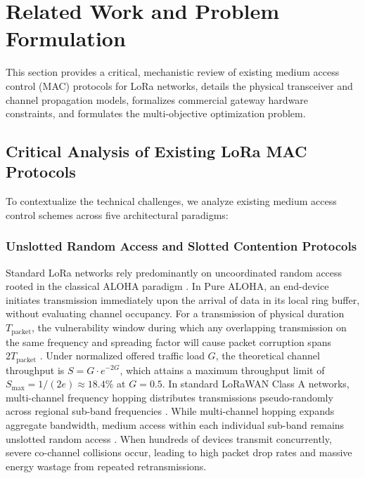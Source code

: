 \documentclass[preprint,review,12pt]{elsarticle}
\begin{document}
\section{Related Work and Problem Formulation}
\label{sec:related_work}

This section provides a critical, mechanistic review of existing medium access control (MAC) protocols for LoRa networks, details the physical transceiver and channel propagation models, formalizes commercial gateway hardware constraints, and formulates the multi-objective optimization problem.

\subsection{Critical Analysis of Existing LoRa MAC Protocols}
To contextualize the technical challenges, we analyze existing medium access control schemes across five architectural paradigms:

\subsubsection{Unslotted Random Access and Slotted Contention Protocols}
Standard LoRa networks rely predominantly on uncoordinated random access rooted in the classical ALOHA paradigm \cite{abramson1970aloha, roberts1975aloha}. In Pure ALOHA, an end-device initiates transmission immediately upon the arrival of data in its local ring buffer, without evaluating channel occupancy. For a transmission of physical duration $T_{\text{packet}}$, the vulnerability window during which any overlapping transmission on the same frequency and spreading factor will cause packet corruption spans $2 T_{\text{packet}}$ \cite{adelantado2017understanding}. Under normalized offered traffic load $G$, the theoretical channel throughput is $S = G \cdot e^{-2G}$, which attains a maximum throughput limit of $S_{\text{max}} = 1/(2e) \approx 18.4\%$ at $G = 0.5$. In standard LoRaWAN Class A networks, multi-channel frequency hopping distributes transmissions pseudo-randomly across regional sub-band frequencies \cite{semtech2020sx1276}. While multi-channel hopping expands aggregate bandwidth, medium access within each individual sub-band remains unslotted random access \cite{bor2016lora}. When hundreds of devices transmit concurrently, severe co-channel collisions occur, leading to high packet drop rates and massive energy wastage from repeated retransmissions.
\end{document}
